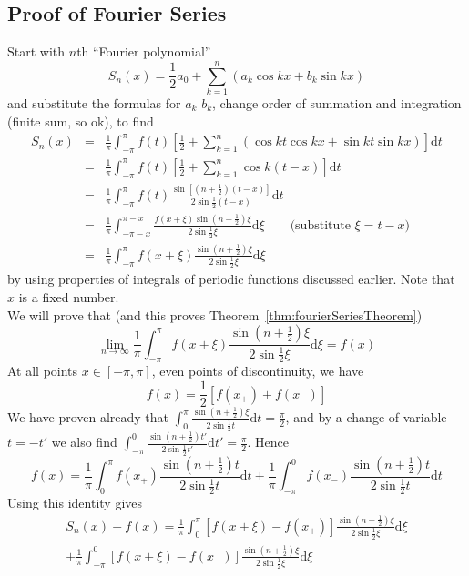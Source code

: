 \documentclass[12pt]{report}
\theoremstyle{definition}
\begin{document}
\subsection{Proof of Fourier Series}
Start with $n$th ``Fourier polynomial''\[
    S_n(x) = \frac{1}{2}a_0 + \sum_{k=1}^{n} (a_k \cos{kx} + b_k \sin{kx})
\]
and substitute the formulas for $a_k$ $b_k$, change order of summation and integration (finite sum, so ok), to find
\begin{eqnarray*}
    S_n(x) &=& \frac{1}{\pi} \int_{-\pi}^{\pi} f(t)\left[\frac{1}{2} + 
           \sum_{k=1}^{n} (\cos{kt}\cos{kx} + \sin{kt}\sin{kx})\right] \mathrm{d}t \\
           &=& \frac{1}{\pi}\int_{-\pi}^{\pi} f(t) \left[\frac{1}{2} 
           + \sum_{k=1}^{n} \cos{k(t-x)}\right] \mathrm{d}t \\
           &=& \frac{1}{\pi}\int_{-\pi}^{\pi} f(t) 
           \frac{\sin{\left[\left(n + \frac{1}{2}\right) \left(t-x\right) \right]}}
           {2\sin{\frac{1}{2}(t-x)}} \mathrm{d}t \\
           &=& \frac{1}{\pi}\int_{-\pi-x}^{\pi-x} 
           \frac{f(x + \xi) \sin{(n + \frac{1}{2})\xi}}{2\sin{\frac{1}{2}\xi}} \mathrm{d}\xi \qquad 
           \text{(substitute $\xi = t - x$)} \\
           &=& \frac{1}{\pi} \int_{-\pi}^{\pi} f(x + \xi)
           \frac{\sin{(n + \frac{1}{2})\xi}}{2\sin{\frac{1}{2}\xi}} \mathrm{d}\xi
\end{eqnarray*}
by using properties of integrals of periodic functions discussed earlier. Note that $x$ is a fixed number.
\medskip
\\We will prove that (and this proves Theorem~\ref{thm:fourierSeriesTheorem})\[
    \lim_{n \rightarrow \infty} \frac{1}{\pi}\int_{-\pi}^{\pi} f(x+\xi)
    \frac{\sin{(n + \frac{1}{2}) \xi}}{2\sin{\frac{1}{2} \xi}} \mathrm{d}\xi = f(x)
\]
At all points $x \in [-\pi, \pi]$, even points of discontinuity, we have \[
    f(x) = \frac{1}{2} [f(x_+) + f(x_-)]
\]
We have proven already that 
$\int_{0}^{\pi} \frac{\sin{(n+\frac{1}{2}) \xi}}{2\sin{\frac{1}{2} t}} \mathrm{d}t = \frac{\pi}{2}$,
and by a change of variable $t = -t'$ we also find 
$\int_{-\pi}^{0} \frac{\sin{(n + \frac{1}{2}) t'}}{2\sin{\frac{1}{2} t'}} \mathrm{d}t' = \frac{\pi}{2}$.
Hence \[
    f(x) = \frac{1}{\pi}\int_{0}^{\pi} f(x_+) \frac{\sin{(n+\frac{1}{2}) t}}{2\sin{\frac{1}{2} t}}\mathrm{d}t
    + \frac{1}{\pi}\int_{-\pi}^{0} f(x_-) \frac{\sin{(n+\frac{1}{2}) t}}{2\sin{\frac{1}{2} t}} \mathrm{d}t
\]
Using this identity gives\[
    \begin{split}
        S_n(x) - f(x) = \frac{1}{\pi}\int_{0}^{\pi} [f(x+\xi) - f(x_+)] 
        \frac{\sin{(n+\frac{1}{2})\xi}}{2\sin{\frac{1}{2}\xi}} \mathrm{d}\xi \\
        + \frac{1}{\pi}\int_{-\pi}^{0} [f(x+\xi) - f(x_-)]
        \frac{\sin{(n+\frac{1}{2})\xi}}{2\sin{\frac{1}{2}\xi}}\mathrm{d}\xi
    \end{split}
\]
\end{document}
